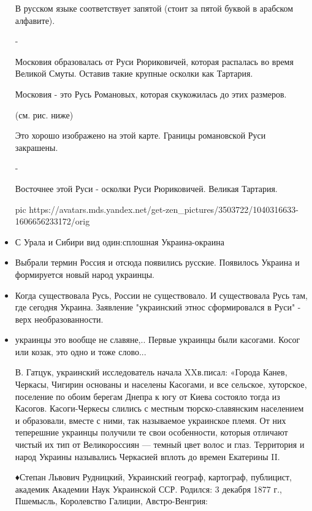 \begin{itemize}
В русском языке соответствует запятой (стоит за пятой буквой в арабском
алфавите).

-

Московия образовалась от Руси Рюриковичей, которая распалась во время Великой
Смуты. Оставив такие крупные осколки как Тартария.

Московия - это Русь Романовых, которая скукожилась до этих размеров.

(см. рис. ниже)

Это хорошо изображено на этой карте. Границы романовской Руси закрашены.

-

Восточнее этой Руси - осколки Руси Рюриковичей. Великая Тартария.

\ifcmt
pic https://avatars.mds.yandex.net/get-zen_pictures/3503722/1040316633-1606656233172/orig
\fi

\item {}

С Урала и Сибири вид один:сплошная Украина-окраина

\item {}

Выбрали термин Россия и отсюда появились русские. Появилось Украина и формируется новый народ украинцы.

\item {}

Когда существовала Русь, России не существовало. И существовала Русь там, где
сегодня Украина. Заявление "украинский этнос сформировался в Руси" - верх
необразованности.

\item {}

украинцы это вообще не славяне,.. Первые украинцы были касогами. Косог или
козак, это одно и тоже слово...

В. Гатцук, украинский исследователь начала XXв.писал: «Города Канев, Черкасы,
Чигирин основаны и населены Касогами, и все сельское, хуторское, поселение по
обоим берегам Днепра к югу от Киева состояло тогда из Касогов. Касоги-Черкесы
слились с местным тюрско-славянским населением и образовали, вместе с ними, так
называемое украинское племя. От них теперешние украинцы получили те свои
особенности, которыя отличают чистый их тип от Великороссиян — темный цвет
волос и глаз. Территория и народ Украины назывались Черкасией вплоть до времен
Екатерины II.

♦Степан Львович Рудницкий, Украинский географ, картограф, публицист, академик
Академии Наук Украинской ССР. Родился: 3 декабря 1877 г., Пшемысль, Королевство
Галиции, Австро-Венгрия:


\end{itemize}
